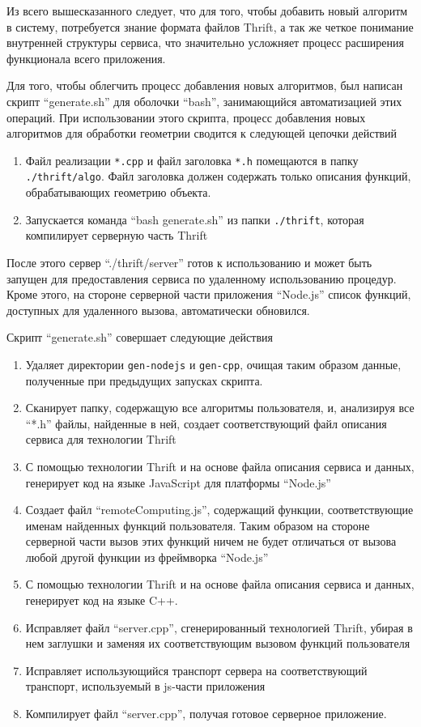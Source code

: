 Из всего вышесказанного следует, что для того, чтобы добавить новый алгоритм в
систему, потребуется знание
формата файлов Thrift, а так же четкое понимание внутренней структуры сервиса,
что значительно усложняет процесс расширения функционала всего приложения.

Для того, чтобы облегчить процесс добавления новых алгоритмов, был написан
скрипт ``generate.sh'' для оболочки ``bash'', занимающийся автоматизацией этих
операций. При использовании этого скрипта, процесс добавления новых алгоритмов
для обработки геометрии сводится к следующей цепочки действий
\begin{enumerate}
    \item Файл реализации \texttt{*.cpp} и файл заголовка \texttt{*.h}
    помещаются в папку \texttt{./thrift/algo}. Файл заголовка должен содержать
    только описания функций, обрабатывающих геометрию объекта.
    \item Запускается команда ``bash generate.sh'' из папки \texttt{./thrift},
    которая компилирует серверную часть Thrift
\end{enumerate}

После этого сервер ``./thrift/server'' готов к использованию и может быть
запущен для предоставления сервиса по удаленному использованию процедур. Кроме
этого, на стороне серверной части приложения ``Node.js'' список функций,
доступных для удаленного вызова, автоматически обновился.

Скрипт ``generate.sh'' совершает следующие действия
\begin{enumerate}
    \item Удаляет директории \texttt{gen-nodejs} и \texttt{gen-cpp}, очищая
    таким образом данные, полученные при предыдущих запусках скрипта.
    \item Сканирует папку, содержащую все алгоритмы пользователя, и, анализируя
    все ``*.h'' файлы, найденные в ней, создает соответствующий файл описания
    сервиса для технологии Thrift
    \item С помощью технологии Thrift и на основе файла описания сервиса и
    данных, генерирует код на языке JavaScript для платформы ``Node.js''
    \item Создает файл ``remoteComputing.js'', содержащий функции,
    соответствующие именам найденных функций пользователя. Таким образом на
    стороне серверной части вызов этих функций ничем не будет отличаться
    от вызова любой другой функции из фреймворка ``Node.js''
    \item С помощью технологии Thrift и на основе файла описания сервиса и
    данных, генерирует код на языке C++.
    \item Исправляет файл ``server.cpp'', сгенерированный технологией Thrift,
    убирая в нем заглушки и заменяя их соответствующим вызовом функций
    пользователя
    \item Исправляет использующийся транспорт сервера на соответствующий
    транспорт, используемый в js-части приложения
    \item Компилирует файл ``server.cpp'', получая готовое серверное приложение.
\end{enumerate}

